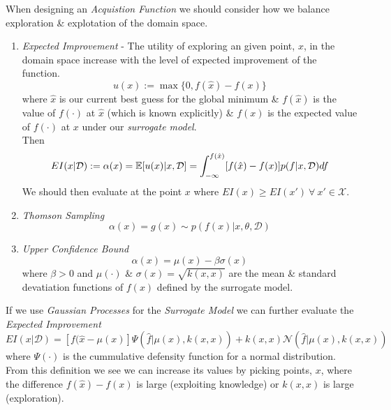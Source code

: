 \documentclass[11pt,a4paper]{article}
\begin{document}
When designing an \textit{Acquistion Function} we should consider how we balance exploration \& explotation of the domain space.
\begin{enumerate}
	\item \textit{Expected Improvement} - The utility of exploring an given point, $x$, in the domain space increase with the level of expected improvement of the function.
	$$u(x):=\max\{0,f(\hat{x})-f(x)\}$$
	where $\hat{x}$ is our current best guess for the global minimum \& $f(\hat{x})$ is the value of $f(\cdot)$ at $\hat{x}$ (which is known explicitly) \& $f(x)$ is the expected value of $f(\cdot)$ at $x$ under our \textit{surrogate model}.\\
	Then
$$EI(x|\mathcal{D}):=\alpha(x)=\mathbb{E}[u(x)|x,\mathcal{D}]=\int_{-\infty}^{f(\hat{x})}[f(\hat{x})-f(x)]p(f|x,\mathcal{D})df$$
	We should then evaluate at the point $x$ where $EI(x)\geq EI(x')\ \forall\ x'\in\mathcal{X}$.
	\item \textit{Thomson Sampling}
	$$\alpha(x)=g(x)\sim p(f(x)|x,\theta,\mathcal{D})$$
	\item \textit{Upper Confidence Bound}
	$$\alpha(x)=\mu(x)-\beta\sigma(x)$$
	where $\beta>0$ and $\mu(\cdot)$ \& $\sigma(x)=\sqrt{k(x,x)}$ are the mean \& standard devatiation functions of $f(x)$ defined by the surrogate model.
\end{enumerate}

If we use \textit{Gaussian Processes} for the \textit{Surrogate Model} we can further evaluate the \textit{Expected Improvement}
$$EI(x|\mathcal{D})=[f(\hat{x}-\mu(x)]\Psi(\hat{f}|\mu(x),k(x,x))+k(x,x)\mathcal{N}(\hat{f}|\mu(x),k(x,x))$$
where $\Psi(\cdot)$ is the cummulative defensity function for a normal distribution.\\
From this definition we see we can increase its values by picking points, $x$, where the difference $f(\hat{x})-f(x)$ is large (exploiting knowledge) or $k(x,x)$ is large (exploration).\\
\end{document}
